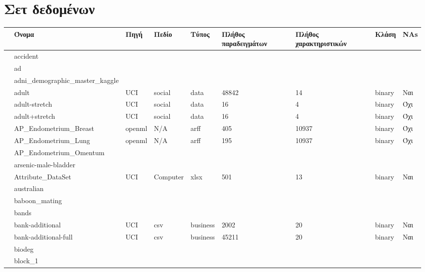 \chapter{Σετ δεδομένων }
\label{appendix:Datasets}
\noindent
	 	\noindent\begin{longtable}{| p{} | p{}| p{} | p{} | p{} | p{} | p{} | p{} | p{} | } 
 			\hline
 			 & Όνομα & Πηγή & Πεδίο & Τύπος & Πλήθος παραδειγμάτων & Πλήθος χαρακτηριστικών & Κλάση & NAs \\
 			\hline 
 			\rownumber  & accident & & & & & & &\\
 			\rownumber & ad & & & & & & &\\
 			\rownumber & adni\_demographic\_master\_kaggle & & & & & & &\\
 			\rownumber &  adult \citep{census}  & UCI & social & data  & 48842 & 14 & binary & Ναι\\
 			\rownumber &  adult-stretch \citep{balloons} & UCI & social & data & 16 & 4 & binary & Όχι\\
 			\rownumber &  adult+stretch \citep{balloons} & UCI & social & data & 16 & 4 & binary & Όχι\\
 			\rownumber &  AP\_Endometrium\_Breast \citep{breast} & openml & N/A & arff & 405 & 10937 & binary & Όχι\\
 			\rownumber & AP\_Endometrium\_Lung \citep{lung} & openml & N/A & arff  & 195 & 10937 & binary  & Όχι\\
 			\rownumber &  AP\_Endometrium\_Omentum & & & & & & & \\
 			\rownumber & arsenic-male-bladder & & & & & & &\\
 			\rownumber & Attribute\_DataSet & UCI & Computer & xlsx & 501 & 13 & binary  & Ναι \\
 			\rownumber & australian & & & & & & & \\
 		\rownumber & baboon\_mating & & & & & & &\\
 			\rownumber &  bands & & & & & & &\\
 			\rownumber & bank-additional & UCI & csv & business & 2002 & 20 & binary & Ναι \\
 		\rownumber &  bank-additional-full & UCI & csv& business & 45211& 20& binary& Ναι \\
 			\rownumber &  biodeg & & & & & & & \\
 			\rownumber & block\_1 & & & & & & & \\

\end{longtable}
